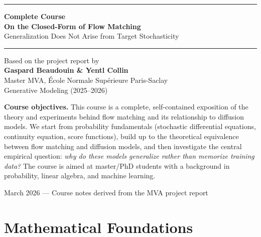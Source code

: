 \documentclass[11pt, a4paper]{article}
\theoremstyle{plain}
\theoremstyle{definition}
\theoremstyle{remark}
\begin{document}

\begin{titlepage}
\centering
\vspace*{3cm}
{\color{mainblue}\rule{\linewidth}{2pt}}
\vspace{0.5cm}

{\Huge\bfseries\color{mainblue} Complete Course}\\[0.4cm]
{\Large\bfseries On the Closed-Form of Flow Matching}\\[0.3cm]
{\large\color{darkgray} Generalization Does Not Arise from Target Stochasticity}

\vspace{0.5cm}
{\color{mainblue}\rule{\linewidth}{2pt}}
\vspace{1.5cm}

{\large Based on the project report by}\\[0.3cm]
{\large\bfseries Gaspard Beaudouin \& Yentl Collin}\\[0.2cm]
{\normalsize Master MVA, \'{E}cole Normale Sup\'{e}rieure Paris-Saclay}\\
{\normalsize Generative Modeling (2025--2026)}

\vspace{1.5cm}
\begin{tcolorbox}[colback=lightblue,colframe=mainblue,arc=6pt,left=12pt,right=12pt,top=10pt,bottom=10pt]
\textbf{Course objectives.} This course is a complete, self-contained exposition of the theory and experiments behind flow matching and its relationship to diffusion models. We start from probability fundamentals (stochastic differential equations, continuity equation, score functions), build up to the theoretical equivalence between flow matching and diffusion models, and then investigate the central empirical question: \emph{why do these models generalize rather than memorize training data?} The course is aimed at master/PhD students with a background in probability, linear algebra, and machine learning.
\end{tcolorbox}

\vfill
{\small\color{darkgray} March 2026 --- Course notes derived from the MVA project report}
\end{titlepage}

\tableofcontents
\newpage

\part{Mathematical Foundations}
\end{document}
